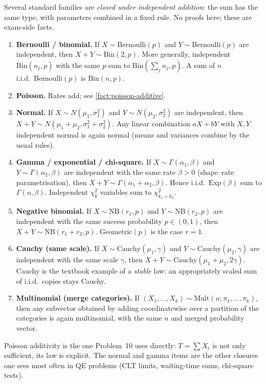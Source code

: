 \documentclass[11pt,a4paper]{article}
\begin{document}
\begin{remark}
\label{rem:sum-closure}
Several standard families are \emph{closed under independent addition}: the sum has the same type, with parameters combined in a fixed rule. No proofs here; these are exam-side facts.
\begin{enumerate}[label=\textup{(\arabic*)}]
    \item
    \textbf{Bernoulli / binomial.} If \(X\sim\mathrm{Bernoulli}(p)\) and \(Y\sim\mathrm{Bernoulli}(p)\) are independent, then \(X+Y\sim\mathrm{Bin}(2,p)\). More generally, independent \(\mathrm{Bin}(n_j,p)\) with the same \(p\) sum to \(\mathrm{Bin}(\sum_j n_j,p)\). A sum of \(n\) i.i.d.\ Bernoulli\((p)\) is \(\mathrm{Bin}(n,p)\).
    \item
    \textbf{Poisson.} Rates add; see \cref{fact:poisson-additive}.
    \item
    \textbf{Normal.} If \(X\sim N(\mu_1,\sigma_1^2)\) and \(Y\sim N(\mu_2,\sigma_2^2)\) are independent, then \(X+Y\sim N(\mu_1+\mu_2,\sigma_1^2+\sigma_2^2)\). Any linear combination \(aX+bY\) with \(X,Y\) independent normal is again normal (means and variances combine by the usual rules).
    \item
    \textbf{Gamma / exponential / chi-square.} If \(X\sim\Gamma(\alpha_1,\beta)\) and \(Y\sim\Gamma(\alpha_2,\beta)\) are independent with the same rate \(\beta>0\) (shape--rate parametrisation), then \(X+Y\sim\Gamma(\alpha_1+\alpha_2,\beta)\). Hence i.i.d.\ \(\mathrm{Exp}(\beta)\) sum to \(\Gamma(n,\beta)\). Independent \(\chi_k^2\) variables sum to \(\chi_{k_1+k_2}^2\).
    \item
    \textbf{Negative binomial.} If \(X\sim\mathrm{NB}(r_1,p)\) and \(Y\sim\mathrm{NB}(r_2,p)\) are independent with the same success probability \(p\in(0,1)\), then \(X+Y\sim\mathrm{NB}(r_1+r_2,p)\). Geometric\((p)\) is the case \(r=1\).
    \item
    \textbf{Cauchy (same scale).} If \(X\sim\mathrm{Cauchy}(\mu_1,\gamma)\) and \(Y\sim\mathrm{Cauchy}(\mu_2,\gamma)\) are independent with the same scale \(\gamma\), then \(X+Y\sim\mathrm{Cauchy}(\mu_1+\mu_2,2\gamma)\). Cauchy is the textbook example of a \emph{stable} law: an appropriately scaled sum of i.i.d.\ copies stays Cauchy.
    \item
    \textbf{Multinomial (merge categories).} If \((X_1,\dots,X_k)\sim\mathrm{Mult}(n;\pi_1,\dots,\pi_k)\), then any subvector obtained by adding coordinatewise over a partition of the categories is again multinomial, with the same \(n\) and merged probability vector.
\end{enumerate}
Poisson additivity is the one Problem~10 uses directly: \(T=\sum X_i\) is not only sufficient, its law is explicit. The normal and gamma items are the other closures one sees most often in QE problems (CLT limits, waiting-time sums, chi-square tests).
\end{remark}
\end{document}
